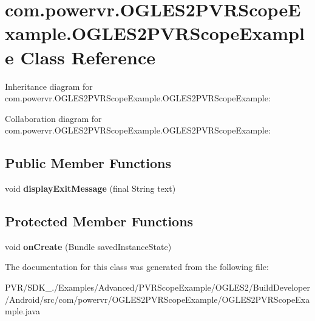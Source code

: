 \hypertarget{classcom_1_1powervr_1_1_o_g_l_e_s2_p_v_r_scope_example_1_1_o_g_l_e_s2_p_v_r_scope_example}{\section{com.\+powervr.\+O\+G\+L\+E\+S2\+P\+V\+R\+Scope\+Example.\+O\+G\+L\+E\+S2\+P\+V\+R\+Scope\+Example Class Reference}
\label{classcom_1_1powervr_1_1_o_g_l_e_s2_p_v_r_scope_example_1_1_o_g_l_e_s2_p_v_r_scope_example}
}


Inheritance diagram for com.\+powervr.\+O\+G\+L\+E\+S2\+P\+V\+R\+Scope\+Example.\+O\+G\+L\+E\+S2\+P\+V\+R\+Scope\+Example\+:


Collaboration diagram for com.\+powervr.\+O\+G\+L\+E\+S2\+P\+V\+R\+Scope\+Example.\+O\+G\+L\+E\+S2\+P\+V\+R\+Scope\+Example\+:
\subsection*{Public Member Functions}
\begin{DoxyCompactItemize}
\item 
\hypertarget{classcom_1_1powervr_1_1_o_g_l_e_s2_p_v_r_scope_example_1_1_o_g_l_e_s2_p_v_r_scope_example_aff36b610f1e96e4ecbe1936106cab096}{void {\bfseries display\+Exit\+Message} (final String text)}\label{classcom_1_1powervr_1_1_o_g_l_e_s2_p_v_r_scope_example_1_1_o_g_l_e_s2_p_v_r_scope_example_aff36b610f1e96e4ecbe1936106cab096}

\end{DoxyCompactItemize}
\subsection*{Protected Member Functions}
\begin{DoxyCompactItemize}
\item 
\hypertarget{classcom_1_1powervr_1_1_o_g_l_e_s2_p_v_r_scope_example_1_1_o_g_l_e_s2_p_v_r_scope_example_a2af4d5846b99e730204225b82da9ecce}{void {\bfseries on\+Create} (Bundle saved\+Instance\+State)}\label{classcom_1_1powervr_1_1_o_g_l_e_s2_p_v_r_scope_example_1_1_o_g_l_e_s2_p_v_r_scope_example_a2af4d5846b99e730204225b82da9ecce}

\end{DoxyCompactItemize}


The documentation for this class was generated from the following file\+:\begin{DoxyCompactItemize}
\item 
P\+V\+R/\+S\+D\+K\+\_./\+Examples/\+Advanced/\+P\+V\+R\+Scope\+Example/\+O\+G\+L\+E\+S2/\+Build\+Developer/\+Android/src/com/powervr/\+O\+G\+L\+E\+S2\+P\+V\+R\+Scope\+Example/O\+G\+L\+E\+S2\+P\+V\+R\+Scope\+Example.\+java\end{DoxyCompactItemize}
